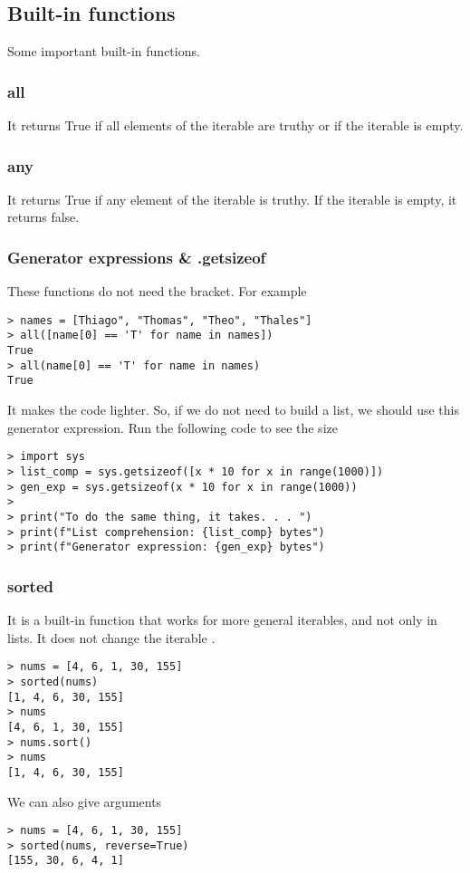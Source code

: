 \subsection{Built-in functions}

Some important built-in functions.

\subsubsection{all} It returns True if all elements of the iterable are truthy or if the iterable is empty. 

\subsubsection{any} It returns True if any element of the iterable is truthy. If the iterable is empty, it returns false. 

\subsubsection{Generator expressions \& .getsizeof} These functions do not need the bracket. For example
\begin{verbatim}
> names = [Thiago", "Thomas", "Theo", "Thales"]
> all([name[0] == 'T' for name in names])
True
> all(name[0] == 'T' for name in names)
True
\end{verbatim}
It makes the code lighter. So, if we do not need to build a list, we should use this generator expression. Run the following code to see the size
\begin{verbatim}
> import sys
> list_comp = sys.getsizeof([x * 10 for x in range(1000)])
> gen_exp = sys.getsizeof(x * 10 for x in range(1000))
> 
> print("To do the same thing, it takes. . . ")
> print(f"List comprehension: {list_comp} bytes")
> print(f"Generator expression: {gen_exp} bytes") 
\end{verbatim}

\subsubsection{sorted} It is a built-in function that works for more general iterables, and not only in lists. It does not change the iterable .
\begin{verbatim}
> nums = [4, 6, 1, 30, 155]
> sorted(nums)
[1, 4, 6, 30, 155]
> nums
[4, 6, 1, 30, 155]
> nums.sort()
> nums
[1, 4, 6, 30, 155]
\end{verbatim}
We can also give arguments
\begin{verbatim}
> nums = [4, 6, 1, 30, 155]
> sorted(nums, reverse=True)
[155, 30, 6, 4, 1]
\end{verbatim}

